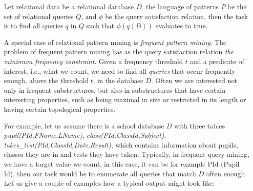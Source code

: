 \begin{definition*}
\begin{mdframed}
    Let relational data be a relational database $D$, the language of
    patterns $P$ be the set of relational queries $Q$, and 
    $\phi$ be the query satisfaction relation, then the task is to find
    all queries $q$ in $Q$ such that $\phi(q(D))$ evaluates to true.
\end{mdframed}
\end{definition*}
A special case of relational pattern mining is 
\textit{frequent pattern mining}. The problem of frequent pattern
mining has as the query satisfaction relation \textit{the minimum frequency
constraint}. Given a frequency threshold $t$ and a predicate of
interest, i.e., what we count, we need to find
all \textit{queries} that occur frequently enough, above the
threshold $t$, in the database $D$. Often we are interested not only in
frequent substructures, but also in substructures that have certain
interesting properties, such as being maximal in size or restricted in
its length or having certain topological properties.

For example, let us assume there is a school database $D$ with three
tables \textit{pupil(PId,FName,LName)},
\textit{class(PId,ClassId,Subject)}, \\
\textit{takes\_test(PId,ClassId,Date,Result)}, which contains
information about pupils, classes they are in and tests they have
taken. Typically, in frequent query mining, we have a target value we
count, in this case, it can be for example PId (Pupil Id), then our
task would be to enumerate all queries that match $D$ often enough.
Let us give a couple of examples how a typical output might look like:

